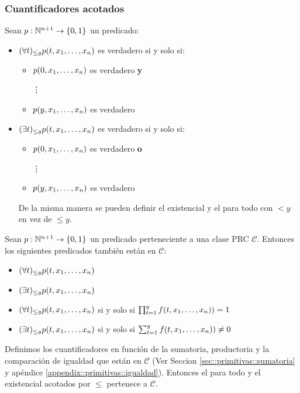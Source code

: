 \subsubsection{Cuantificadores acotados}
Sean $p:\mathbb{N}^{n+1}\to\{0,1\}$ un predicado:
\begin{itemize}
	\item[] $(\forall t)_{\leq y} p(t,x_1,\dots, x_{n})$ es verdadero si y solo si:
	\begin{itemize}
		\item $p(0, x_1,\dots, x_{n})$ es verdadero \textbf{y}
		
		\hspace*{1cm}\vdots
		
		\item $p(y, x_1,\dots, x_{n})$ es verdadero 
	\end{itemize}
\item[] $(\exists t)_{\leq y} p(t,x_1,\dots, x_{n})$ es verdadero si y solo si:
\begin{itemize}
	\item $p(0, x_1,\dots, x_{n})$ es verdadero \textbf{o}
	
	\hspace*{1cm}\vdots
	
	\item $p(y, x_1,\dots, x_{n})$ es verdadero 
\end{itemize}
De la misma manera se pueden definir el existencial y el para todo con $< y$ en vez de $\leq y$.
\end{itemize}
\begin{teorema}
 Sean $p:\mathbb{N}^{n+1}\to\{0,1\}$ un predicado perteneciente a una clase PRC $\mathcal{C}$. Entonces los siguientes predicados también están en $\mathcal{C}$:

\begin{itemize}
	\item[] $(\forall t)_{\leq y} p(t,x_1,\dots, x_{n})$ 
	\item[] $(\exists t)_{\leq y} p(t,x_1,\dots, x_{n})$
\end{itemize}
\end{teorema}

\begin{demo}
\begin{itemize}
	\item[] $(\forall t)_{\leq y} p(t,x_1,\dots, x_{n})$ si y solo si $\prod_{t=1}^{y} f(t,x_1,\dots, x_{n})) = 1$
	\item[] $(\exists t)_{\leq y} p(t,x_1,\dots, x_{n})$ si y solo si $\sum_{t=1}^{y} f(t,x_1,\dots, x_{n})) \neq 0$
\end{itemize}
Definimos los cuantificadores en función de la sumatoria, productoria y la comparación de igualdad que están en $\mathcal{C}$ (Ver Seccion \ref{sec::primitivas::sumatoria} y apéndice \ref{appendix::primitivas::igualdad}). Entonces el para todo y el existencial acotados por $\leq$ pertenece a $\mathcal{C}$.
\end{demo}

